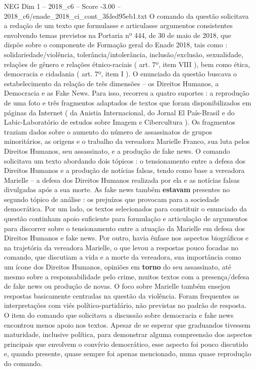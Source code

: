 \begin{textsample}{NEG Dim 1 – 2018\_c6 – Score -3.00 – 2018\_c6/enade\_2018\_ci\_cont\_3fded95eb1.txt}
O comando da questão solicitava a redação de um texto que formulasse e articulasse argumentos consistentes envolvendo temas previstos na Portaria nº 444, de 30 de maio de 2018, que dispõe sobre o componente de Formação geral do Enade 2018, tais como : solidariedade/violência, tolerância/intolerância, inclusão/exclusão, sexualidade, relações de gênero e relações étnico-raciais ( art. 7º, item VIII ), bem como ética, democracia e cidadania ( art. 7º, item I ).
O enunciado da questão buscava o estabelecimento da relação de três dimensões – os Direitos Humanos, a Democracia e as Fake News.
Para isso, recorreu a quatro suportes : a reprodução de uma foto e três fragmentos adaptados de textos que foram disponibilizados em páginas da Internet ( da Anistia Internacional, do Jornal El País-Brasil e do Labic-Laboratório de estudos sobre Imagem e Cibercultura ).
Os fragmentos traziam dados sobre o aumento do número de assassinatos de grupos minoritários, as origens e o trabalho da vereadora Marielle Franco, sua luta pelos Direitos Humanos, seu assassinato, e a produção de fake news.
O comando solicitava um texto abordando dois tópicos : o tensionamento entre a defesa dos Direitos Humanos e a produção de notícias falsas, tendo como base a vereadora Marielle – a defesa dos Direitos Humanos realizada por ela e as notícias falsas divulgadas após a sua morte.
As fake news também \textbf{estavam} presentes no segundo tópico de análise : os prejuízos que provocam para a sociedade democrática.
Por um lado, os textos selecionados para constituir o enunciado da questão continham apoio suficiente para formulação e articulação de argumentos para discorrer sobre o tensionamento entre a atuação da Marielle em defesa dos Direitos Humanos e fake news.
Por outro, havia ênfase nos aspectos biográficos e na trajetória da vereadora Marielle, o que levou a respostas pouco focadas no comando, que discutiam a vida e a morte da vereadora, sua importância como um ícone dos Direitos Humanos, opiniões em \textbf{torno} do seu assassinato, até mesmo sobre a responsabilidade pelo crime, muitos textos com a presença/defesa de fake news ou produção de novas.
O foco sobre Marielle também ensejou respostas basicamente centradas na questão da violência.
Foram frequentes as interpretações com viés político-partidário, não previstas no padrão de resposta.
O item do comando que solicitava a discussão sobre democracia e fake news encontrou menos apoio nos textos.
Apesar de se esperar que graduandos tivessem maturidade, inclusive política, para demonstrar alguma compreensão dos aspectos principais que envolvem o convívio democrático, esse aspecto foi pouco discutido e, quando presente, quase sempre foi apenas mencionado, numa quase reprodução do comando.

\end{textsample}
